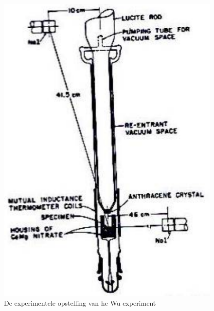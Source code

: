 \documentclass[../main.tex]{subfiles}
\begin{document}
\begin{figure}[h]
    \centering
    \includegraphics[width=0.6\linewidth]{parity_violation/wu_exp_opstelling.png}
    \caption{De experimentele opstelling van he Wu experiment}%
    \label{fig:parity_violation/wu_exp_opstelling}
\end{figure}
\end{document}
